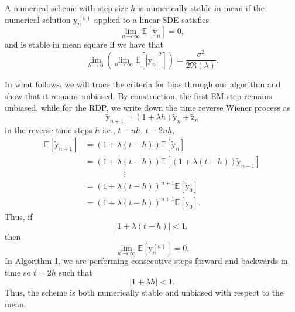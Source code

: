 \documentclass{article}
\newcommand{\y}{\boldsymbol{\mathrm{y}}}
\newcommand{\z}{\boldsymbol{\mathrm{z}}}
\begin{document}
A numerical scheme with step size $h$ is numerically stable in mean
if the numerical solution $\y_{n}^{\left(h\right)}$ applied to a linear
SDE satisfies 
\[
\lim_{n\rightarrow\infty}\mathbb{E}\left[\y_{n}\right]=0,
\]
and is stable in mean square \citep{saito1996stability} if we have that
\[
\lim_{h\rightarrow0}\left(\lim_{n\rightarrow\infty}\mathbb{E}\left[\left|\y_{n}\right|^{2}\right]\right)=\frac{\sigma^{2}}{2\Re(\lambda)}.
\]

In what follows, we will trace the criteria for bias through our algorithm
and show that it remains unbiased. By construction, the first
EM step remains unbiased, while for the RDP, we write down the time
reverse Wiener process as
\[
\tilde{\y}_{n+1}=\left(1+\lambda h\right)\tilde{\y}_{n}+\tilde{\z}_{n}
\]
in the reverse time steps $h$ i.e., $t-nh$, $t-2nh$,
\begin{align*}
\mathbb{E}\left[\tilde{\y}_{n+1}\right] &=\left(1+\lambda\left(t-h\right)\right)\mathbb{E}\left[\tilde{\y}_{n}\right] \\ 
 &= \left(1+\lambda\left(t-h\right)\right)\mathbb{E}\left[\left(1+\lambda\left(t-h\right)\right)\tilde{\y}_{n-1}\right]\\
 & \hspace{2cm}\vdots \\
 &= \left(1+\lambda\left(t-h\right)\right)^{n+1}\mathbb{E}\left[\tilde{\y}_{0}\right]\\
 &= \left(1+\lambda\left(t-h\right)\right)^{n+1}\mathbb{E}\left[\y_{0}\right].
\end{align*}
Thus, if 
\[
\left|1+\lambda\left(t-h\right)\right|<1,
\]
then 
\[
\lim_{n\rightarrow\infty}\mathbb{E}\left[\y_{n}^{\left(h\right)}\right]=0.
\]
In Algorithm 1, we are performing consecutive steps forward and backwards
in time so $t=2h$ such that
\[
\left|1+\lambda h\right|<1.
\]
Thus, the scheme is both numerically stable and unbiased with respect to the mean. 
\end{document}
